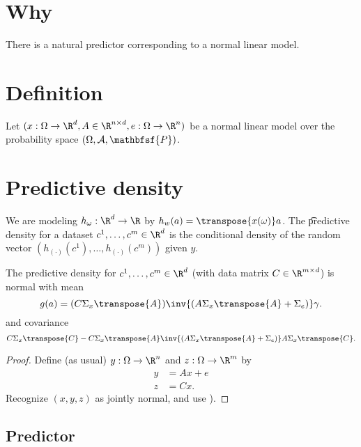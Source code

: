 

\section*{Why}

There is a natural predictor corresponding to a normal linear model.

\section*{Definition}

Let $(x: \Omega  \to \R ^d, A \in \R ^{n \times d}, e: \Omega \to \R ^n)$ be a normal linear model over the probability space $(\Omega , \mathcal{A} , \mathbfsf{P} )$.

\section*{Predictive density}

We are modeling $h_\omega : \R ^d \to \R $ by $h_w(a) = \transpose{x(\omega )}a$.
The \t{predictive density} for a dataset $c^1, \dots , c^m \in \R ^d$ is the conditional density of the random vector $(h_{(\cdot )}(c^1), \dots , h_{(\cdot )}(c^m))$ given $y$.
\begin{proposition}
The predictive density for $c^1, \dots , c^m \in \R ^d$ (with data matrix $C \in \R ^{m \times d}$) is normal with mean
    \[
g(a) = (C\Sigma _{x}\transpose{A})\inv{(A\Sigma _{x}\transpose{A} + \Sigma _e)}\gamma .
    \]
and covariance
    \[
C\Sigma _{x}\transpose{C} - C\Sigma _{x}\transpose{A}\inv{(A\Sigma _{x}\transpose{A} + \Sigma _e)}A\Sigma _{x}\transpose{C}.
    \]
\begin{proof}Define (as usual) $y: \Omega  \to \R ^n$ and $z : \Omega  \to \R ^m$ by
      \[
\begin{aligned}
y &= Ax + e \\
z &= Cx.
\end{aligned}
      \]
Recognize $(x, y, z)$ as jointly normal, and use ).\end{proof}\end{proposition}

\subsection*{Predictor}

